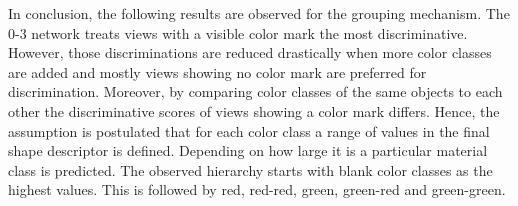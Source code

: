 In conclusion, the following results are observed for the grouping mechanism.
The 0-3 network treats views with a visible color mark the most discriminative.
However, those discriminations are reduced drastically when more color classes are added and mostly views showing no color mark are preferred for discrimination.
Moreover, by comparing color classes of the same objects to each other the discriminative scores of views showing a color mark differs.
Hence, the assumption is postulated that for each color class a range of values in the final shape descriptor is defined.
Depending on how large it is a particular material class is predicted.
The observed hierarchy starts with blank color classes as the highest values.
This is followed by red, red-red, green, green-red and green-green.